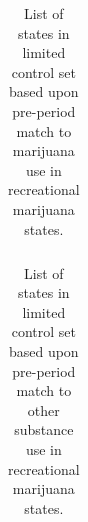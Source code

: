 \documentclass[12pt]{article}%
\begin{document}
\begin{table}[ht]\centering
    \begin{adjustbox}{width=\textwidth}
        \centering
        \caption{List of states in limited control set based upon pre-period match to marijuana use in recreational marijuana states.}
        \begin{tabular}{@{}llp{8cm}p{2cm}p{2cm}p{2cm}@{}}
        \toprule
        \toprule
        
        \end{tabular}
    \label{tab:only_good_pretrends_list_mj}
\end{adjustbox}
\end{table}
\begin{table}[ht]\centering
    \begin{adjustbox}{width=\textwidth}
        \centering
        \caption{List of states in limited control set based upon pre-period match to other substance use in recreational marijuana states.}
        \begin{tabular}{@{}llp{8cm}p{2cm}p{2cm}p{2cm}@{}}
            \toprule
            \toprule
                   
            \bottomrule 
        \end{tabular}
        \label{tab:only_good_pretrends_list_oth}
    \end{adjustbox}
\end{table}
\end{document}
